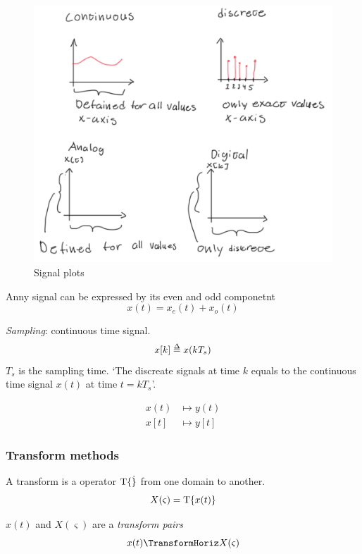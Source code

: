 \begin{figure}[!h]
    \centering
    \includegraphics[width=12cm]{image/caractaristic-signal-plots.pdf}
    \caption{Signal plots}
\end{figure}

Anny signal can be expressed by its even and odd componetnt
\begin{equation}
    x(t) = x_e(t) + x_o(t)
\end{equation}

\textit{Sampling}: continuous time signal.
\begin{equation}
    x[k] \delequal x(k T_s)
\end{equation}
$T_s$ is the sampling time.
`The discreate signals at time $k$ equals to 
the continuous time signal $x(t)$ at time $t = kT_s$'.

\begin{align}
    x(t)  &\mapsto y(t)    \\
    x[t]  &\mapsto y[t]
\end{align}


\subsubsection{Transform methods}
A transform is a operator $\mathrm{T}\{ \dot \}$ from one domain to another.
\begin{equation*}
    X(\varsigma) = \mathrm{T}\{ x(t) \}
\end{equation*}

$x(t)$ and $X(\varsigma)$ are a \textit{transform pairs}
\begin{equation*}
    x(t) \TransformHoriz X(\varsigma)
\end{equation*}


